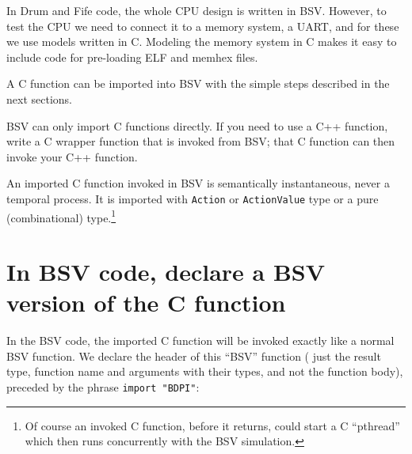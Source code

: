 In Drum and Fife code, the whole CPU design is written in BSV.
However, to test the CPU we need to connect it to a memory system, a
UART, {\etc} and for these we use models written in C.  Modeling the
memory system in C makes it easy to include code for pre-loading ELF
and memhex files.

A C function can be imported into BSV with the simple steps described
in the next sections.

BSV can only import C functions directly.  If you need to use a C++
function, write a C wrapper function that is invoked from BSV; that C
function can then invoke your C++ function.

An imported C function invoked in BSV is semantically instantaneous,
never a temporal process.  It is imported with \verb|Action| or
\verb|ActionValue| type or a pure (combinational) type.\footnote{Of
course an invoked C function, before it returns, could start a C
``pthread'' which then runs concurrently with the BSV simulation.}


\section{In BSV code, declare a BSV version of the C function}


In the BSV code, the imported C function will be invoked exactly like
a normal BSV function.  We declare the header of this ``BSV'' function
({\ie} just the result type, function name and arguments with their
types, and not the function body), preceded by the phrase {\tt import
"BDPI"}:

\begin{center}
\end{center}

